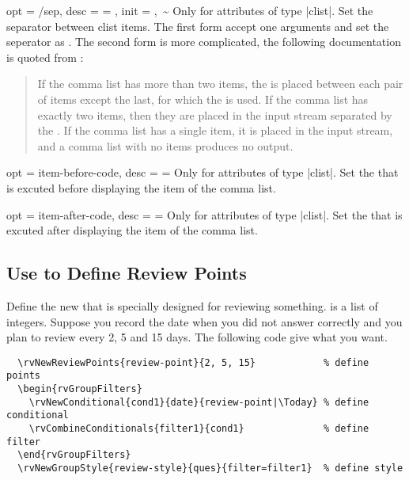 \documentclass[full]{l3doc}
\begin{document}
\begin{documentation}
\begin{option}{
  opt = {/sep},
  desc = {= },
  init = {,~\~}
}
  Only for attributes of type |clist|. Set the separator between clist items.
  The first form accept one arguments and set the seperator as . The
  second form is more complicated, the following documentation is quoted from
  :
  \begin{quote}
    If the comma list has more than two items, the  is placed between each pair of items except the last, for
    which the  is used. If the comma list
    has exactly two items, then they are placed in the input stream separated
    by the . If the comma list has a single item,
    it is placed in the input stream, and a comma list with no items produces
    no output.
  \end{quote}

\end{option}

\begin{option}{
  opt = item-before-code,
  desc = {= }
}
  Only for attributes of type |clist|. Set the  that is
  excuted before displaying the item of the comma list.
\end{option}

\begin{option}{
  opt = item-after-code,
  desc = {= }
}
  Only for attributes of type |clist|. Set the  that is
  excuted after displaying the item of the comma list.
\end{option}

\subsection{Use  to Define Review Points}

\begin{function}{\rvNewReviewPoints}
  \begin{syntax}
      
  \end{syntax}

  Define the new  that is specially designed for reviewing
  something.  is a list of integers. Suppose you record the date
  when you did not answer correctly and you plan to review every 2, 5 and 15
  days. The following code give what you want.
\begin{verbatim}
  \rvNewReviewPoints{review-point}{2, 5, 15}            % define points
  \begin{rvGroupFilters}
    \rvNewConditional{cond1}{date}{review-point|\Today} % define conditional
    \rvCombineConditionals{filter1}{cond1}              % define filter
  \end{rvGroupFilters}
  \rvNewGroupStyle{review-style}{ques}{filter=filter1}  % define style
\end{verbatim}
\end{function}


\end{documentation}
\end{document}
